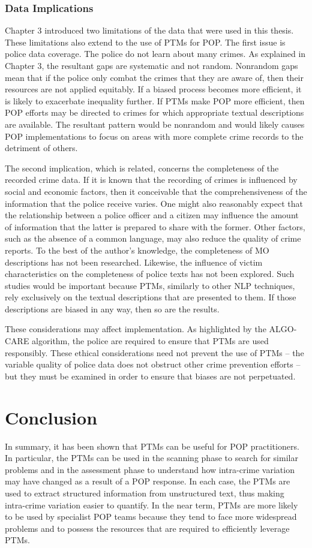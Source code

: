 \subsubsection{Data Implications} Chapter 3 introduced two limitations of the data that were used in this thesis. These limitations also extend to the use of PTMs for POP. The first issue is police data coverage. The police do not learn about many crimes. As explained in Chapter 3, the resultant gaps are systematic and not random. Nonrandom gaps mean that if the police only combat the crimes that they are aware of, then their resources are not applied equitably. If a biased process becomes more efficient, it is likely to exacerbate inequality further. If PTMs make POP more efficient, then POP efforts may be directed to crimes for which appropriate textual descriptions are available. The resultant pattern would be nonrandom and would likely causes POP implementations to focus on areas with more complete crime records to the detriment of others.

The second implication, which is related, concerns the completeness of the recorded crime data. If it is known that the recording of crimes is influenced by social and economic factors, then it conceivable that the comprehensiveness of the information that the police receive varies. One might also reasonably expect that the relationship between a police officer and a citizen may influence the amount of information that the latter is prepared to share with the former. Other factors, such as the absence of a common language, may also reduce the quality of crime reports. To the best of the author’s knowledge, the completeness of MO descriptions has not been researched. Likewise, the influence of victim characteristics on the completeness of police texts has not been explored. Such studies would be important because PTMs, similarly to other NLP techniques, rely exclusively on the textual descriptions that are presented to them. If those descriptions are biased in any way, then so are the results.

These considerations may affect implementation. As highlighted by the ALGO-CARE algorithm, the police are required to ensure that PTMs are used responsibly. These ethical considerations need not prevent the use of PTMs – the variable quality of police data does not obstruct other crime prevention efforts – but they must be examined in order to ensure that biases are not perpetuated.

\section{Conclusion} In summary, it has been shown that PTMs can be useful for POP practitioners. In particular, the PTMs can be used in the scanning phase to search for similar problems and in the assessment phase to understand how intra-crime variation may have changed as a result of a POP response. In each case, the PTMs are used to extract structured information from unstructured text, thus making intra-crime variation easier to quantify. In the near term, PTMs are more likely to be used by specialist POP teams because they tend to face more widespread problems and to possess the resources that are required to efficiently leverage PTMs.

